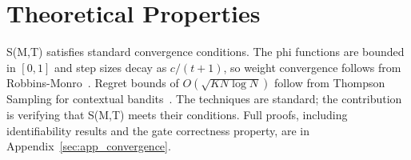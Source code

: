 \section{Theoretical Properties}
\label{sec:theory}

S(M,T) satisfies standard convergence conditions. The phi functions are bounded in $[0,1]$ and step sizes decay as $c/(t+1)$, so weight convergence follows from Robbins-Monro~\citep{robbins1951stochastic}. Regret bounds of $O(\sqrt{KN\log N})$ follow from Thompson Sampling for contextual bandits~\citep{agrawal2013thompson}. The techniques are standard; the contribution is verifying that S(M,T) meets their conditions. Full proofs, including identifiability results and the gate correctness property, are in Appendix~\ref{sec:app_convergence}.
